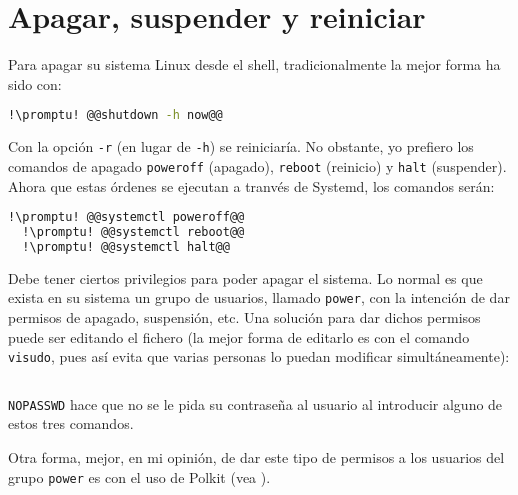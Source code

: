 \section{Apagar, suspender y reiniciar}\label{sec:apagar}
Para apagar su sistema Linux desde el shell, tradicionalmente la mejor forma ha sido con:

\begin{lstlisting}[gobble=2,language=bash,style=bashinteract,escapechar=!]
  !\promptu! @@shutdown -h now@@
\end{lstlisting}

\noindent Con la opción \lstinline+-r+ (en lugar de \lstinline+-h+) se reiniciaría. No obstante, yo prefiero los
comandos de apagado \lstinline+poweroff+ (apagado), \lstinline+reboot+ (reinicio) y \lstinline+halt+
(suspender). Ahora que estas órdenes se ejecutan a tranvés de Systemd, los comandos serán:

\begin{lstlisting}[gobble=2,language=bash,style=bashinteract,escapechar=!]
  !\promptu! @@systemctl poweroff@@
  !\promptu! @@systemctl reboot@@
  !\promptu! @@systemctl halt@@
\end{lstlisting}

Debe tener ciertos privilegios para poder apagar el sistema. Lo normal es que exista en su sistema un grupo de
usuarios, llamado \texttt{power}, con la intención de dar permisos de apagado, suspensión, etc. Una solución
para dar dichos permisos puede ser editando el fichero  (la mejor forma de editarlo es con el
comando \lstinline+visudo+, pues así evita que varias personas lo puedan modificar simultáneamente):

\begin{lstlisting}[gobble=2,language=bash,style=bashinteract,escapechar=!]
  %power ALL=(ALL) NOPASSWD: /usr/bin/systemctl -i poweroff,/usr/bin/systemctl -i halt,/usr/bin/systemctl -i reboot
\end{lstlisting}

\noindent \lstinline+NOPASSWD+ hace que no se le pida su contraseña al usuario al introducir alguno de estos
tres comandos.

Otra forma, mejor, en mi opinión, de dar este tipo de permisos a los usuarios del grupo \texttt{power} es con el
uso de Polkit (vea ).
